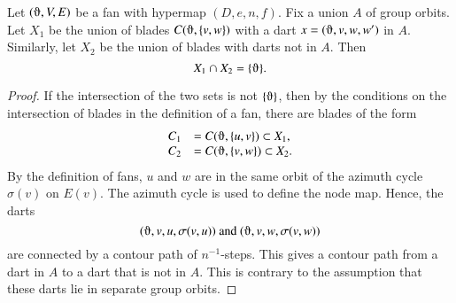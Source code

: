 \begin{lemma}\label{lemma:orbit-connect}
Let $(\orgn,V,E)$ be a fan with hypermap 
$(D,e,n,f)$.
Fix a union $A$ of group orbits.
Let $X_1$ be
the union of blades $C(\orgn,{\{v,w\}})$ with a dart 
$x =
(\orgn,v,w,w')$ in $A$.  Similarly, 
let $X_2$ be the union of blades with darts
not in $A$.  
Then $$X_1\cap X_2 = \{\orgn\}.$$
\end{lemma}

\begin{proof} 
If the intersection of the two sets is not $\{\orgn\}$, then
by the conditions on the intersection of blades in the definition
of a fan,
there are blades of the form
  $$
  \begin{array}{lll}
   C_1 &= C(\orgn,\{u,v\})\subset X_1,\\
   C_2 &= C(\orgn,\{v,w\})\subset X_2.\\
  \end{array}
  $$
By the definition of fans, $u$ and $w$ are
in the same orbit of the azimuth cycle $\sigma(v)$ on $E(v)$.
The azimuth cycle is used to define the node map.
Hence, the darts 
   $$
   (\orgn,v,u,\sigma(v,u)) \text{ and }
   (\orgn,v,w,\sigma(v,w))
   $$
are connected by a contour path of $n^{-1}$-steps.
This gives a contour path from a dart in $A$ to a dart that
is not in $A$.
This is contrary to the assumption that these darts lie in
separate group orbits.
\end{proof}



